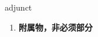 
\begin{frame}
{\huge adjunct}
\begin{center}
\begin{enumerate}\Large
  \item \textbf{附属物，非必须部分}
\end{enumerate}
\end{center}
\end{frame}
